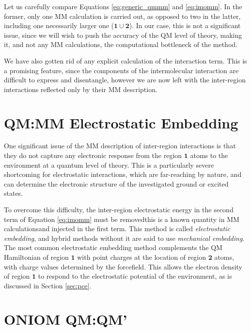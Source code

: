 Let us carefully compare Equations \ref{eq:generic_qmmm} and \ref{eq:imomm}. In the former, only one MM calculation is carried out, as opposed to two in the latter, including one necessarily larger one ($\bm{1}\cup\bm{2}$). In our case, this is not a significant issue, since we will wish to push the accuracy of the QM level of theory, making it, and not any MM calculations, the computational bottleneck of the method.

We have also gotten rid of any explicit calculation of the interaction term. This is a promising feature, since the components of the intermolecular interaction are difficult to express and disentangle, however we are now left with the inter-region interactions reflected only by their MM description.

\section{QM:MM Electrostatic Embedding}
One significant issue of the MM description of inter-region interactions is that they do not capture any electronic response from the region $\bm{1}$ atoms to the environment at a quantum level of theory. This is a particularly severe shortcoming for electrostatic interactions, which are far-reaching by nature, and can determine the electronic structure of the investigated ground or excited states.

To overcome this difficulty, the inter-region electrostatic energy in the second term of Equation \ref{eq:imomm} must be removed\textemdash{}this is a known quantity in MM calculations\textemdash{}and injected in the first term. This method is called \textit{electrostatic embedding}, and hybrid methods without it are said to use \textit{mechanical embedding}. The most common electrostatic embedding method complements the QM Hamiltonian of region $\bm{1}$ with point charges at the location of region $\bm{2}$ atoms, with charge values determined by the forcefield. This allows the electron density of region $\bm{1}$ to respond to the electrostatic potential of the environment, as is discussed in Section \ref{sec:pce}.

\section{ONIOM QM:QM'}

